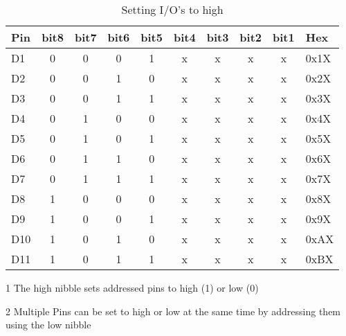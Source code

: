 \documentclass[10pt]{datasheet}
\begin{document}
\begin{table}[h]
\begin{threeparttable}
\caption{Setting I/O's to high}
\begin{tabularx}{\textwidth}{l | c | c | c | c | c | c | c | c | X}
    \thickhline
    \textbf{Pin}	& \textbf{bit8}	& \textbf{bit7}	& \textbf{bit6}	& \textbf{bit5}	& \textbf{bit4}	& \textbf{bit3}	& \textbf{bit2}	& \textbf{bit1} 	& \textbf{Hex} \\
    \hline
    D1	&	0	&	0	&	0	&	1	&	x	&	x	&	x	&	x	&0x1X \\
	\hline
    D2	&	0	&	0	&	1	&	0	& 	x	&	x	&	x	&	x	&0x2X \\
	\hline
    D3	&	0	&	0	&	1	&	1	& 	x	&	x	&	x	&	x	&0x3X \\
	\hline
    D4	&	0	&	1	&	0	&	0	& 	x	&	x	&	x	&	x	&0x4X \\
	\hline
    D5	&	0	&	1	&	0	&	1	& 	x	&	x	&	x	&	x	&0x5X \\
	\hline
    D6	&	0	&	1	&	1	&	0	& 	x	&	x	&	x	&	x	&0x6X \\
	\hline
    D7	&	0	&	1	&	1	&	1	& 	x	&	x	&	x	&	x	&0x7X \\
	\hline
    D8	&	1	&	0	&	0	&	0	& 	x	&	x	&	x	&	x	&0x8X \\
	\hline
    D9	&	1	&	0	&	0	&	1	& 	x	&	x	&	x	&	x	&0x9X \\
	\hline
    D10	&	1	&	0	&	1	&	0	& 	x	&	x	&	x	&	x	&0xAX \\
	\hline
    D11	&	1	&	0	&	1	&	1	& 	x	&	x	&	x	&	x	&0xBX \\
\end{tabularx}
\begin{tablenotes}
\item[1]{The high nibble sets addressed pins to high (1) or low (0)}
\item[2]{Multiple Pins can be set to high or low at the same time by addressing them using the low nibble}
\end{tablenotes}
\end{threeparttable}
\end{table}
\end{document}
